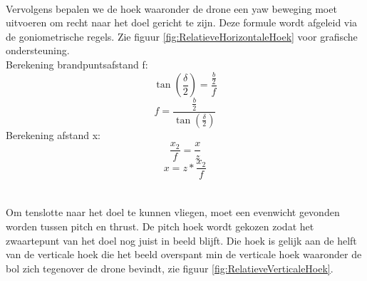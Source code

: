 \\
Vervolgens bepalen we de hoek waaronder de drone een yaw beweging moet uitvoeren om recht naar het doel gericht te zijn. Deze formule wordt afgeleid via de goniometrische regels. Zie figuur \ref{fig:RelatieveHorizontaleHoek} voor grafische ondersteuning. 
\\
Berekening brandpuntsafstand f:
\begin{equation} \label{eq:RelatieveVerticaleHoekBegin}
\tan(\frac{\delta}{2}) = \frac{\frac{b}{2}}{f}
\end{equation}
\begin{equation} 
f = \frac{\frac{b}{2}}{\tan(\frac{\delta}{2})}
\end{equation}
Berekening afstand x:
\begin{equation} 
\frac{x_2}{f} = \frac{x}{z}
\end{equation}
\begin{equation} \label{eq:RelatieveVerticaleHoekEind}
x = z * \frac{x_2}{f}	
\end{equation}
\\
\\
Om tenslotte naar het doel te kunnen vliegen, moet een evenwicht gevonden worden tussen pitch en thrust. De pitch hoek wordt gekozen zodat het zwaartepunt van het doel nog juist in beeld blijft. Die hoek is gelijk aan de helft van de verticale hoek die het beeld overspant min de verticale hoek waaronder de bol zich tegenover de drone bevindt, zie figuur \ref{fig:RelatieveVerticaleHoek}. 
\\
